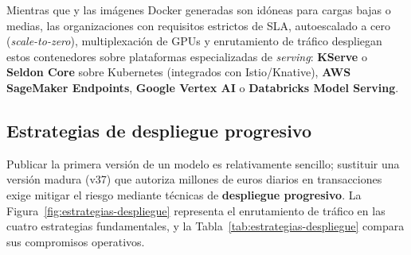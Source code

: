 Mientras que  y las imágenes Docker generadas son idóneas para cargas bajas o medias, las organizaciones con requisitos estrictos de SLA, autoescalado a cero (\textit{scale-to-zero}), multiplexación de GPUs y enrutamiento de tráfico despliegan estos contenedores sobre plataformas especializadas de \textit{serving}: \textbf{KServe} o \textbf{Seldon Core} sobre Kubernetes (integrados con Istio/Knative), \textbf{AWS SageMaker Endpoints}, \textbf{Google Vertex AI} o \textbf{Databricks Model Serving}.

\subsection{Estrategias de despliegue progresivo}

Publicar la primera versión de un modelo es relativamente sencillo; sustituir una versión madura (v37) que autoriza millones de euros diarios en transacciones exige mitigar el riesgo mediante técnicas de \textbf{despliegue progresivo}. La Figura~\ref{fig:estrategias-despliegue} representa el enrutamiento de tráfico en las cuatro estrategias fundamentales, y la Tabla~\ref{tab:estrategias-despliegue} compara sus compromisos operativos.

